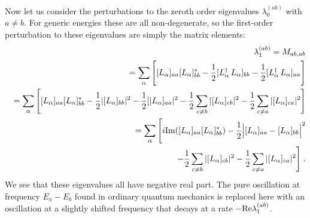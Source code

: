 Now let us consider the perturbations to the zeroth order eigenvalues $\lambda_0^{(ab)}$ with $a\neq b$.  For generic energies these are all non-degenerate, so the first-order perturbation to these eigenvalues are simply the matrix elements:
\begin{eqnarray}
&&\lambda_1^{(ab)}=M_{ab,ab}\nonumber\\&&
=\sum_\alpha \Bigg[[L_\alpha]_{aa}[L_\alpha]^*_{bb}-\frac{1}{2}[L_\alpha^\dagger\,L_\alpha]_{bb}-\frac{1}{2}[L_\alpha^\dagger\,L_\alpha]_{aa}\Bigg]\nonumber\\&&=
\sum_\alpha \Bigg[[L_\alpha]_{aa}[L_\alpha]^*_{bb}-\frac{1}{2}|[L_\alpha]_{bb}|^2-\frac{1}{2}[|L_\alpha]_{aa}|^2-\frac{1}{2}\sum_{c\neq b}|[L_\alpha]_{cb}|^2-\frac{1}{2}\sum_{c\neq a}|[L_\alpha]_{ca}|^2\Bigg]\nonumber\\&&=
\sum_\alpha \Bigg[i{\rm Im}([L_\alpha]_{aa}[L_\alpha]_{bb}^*)-\frac{1}{2}\Big|[L_\alpha]_{aa}-[L_\alpha]_{bb}\Big|^2\nonumber\\&&~~~~~~~~~~~~~~
-\frac{1}{2}\sum_{c\neq b}|[L_\alpha]_{cb}|^2-\frac{1}{2}\sum_{c\neq a}|[L_\alpha]_{ca}|^2\Bigg]  \;.
\end{eqnarray}
We see that these eigenvalues all have negative real part.  The pure oscillation at frequency $E_a-E_b$ found in ordinary quantum mechanics is replaced here with an oscillation at a slightly shifted frequency that decays at a rate $-{\rm Re}\lambda_1^{(ab)}$.  

